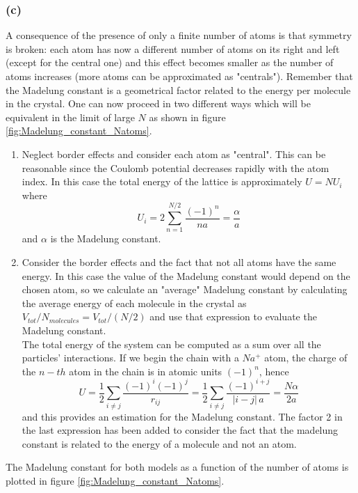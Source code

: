 \subsubsection*{(c)}
A consequence of the presence of only a finite number of atoms is that symmetry is broken: each atom has now a different number of atoms on its right and left (except for the central one) and this 
effect becomes smaller as the number of atoms increases (more atoms can be approximated as "centrals"). Remember that the Madelung constant is a geometrical factor related to the energy per molecule in the crystal. 
One can now proceed in two different ways which will be equivalent in the limit of large $N$ as shown in figure \ref{fig:Madelung_constant_Natoms}. \\
\begin{enumerate}
    \item Neglect border effects and consider each atom as "central". This can be reasonable since the Coulomb potential decreases rapidly with the atom index. In this case the total energy of the lattice is approximately
    $U = NU_i$ where
    $$ U_i = 2\sum_{n=1}^{N/2}\frac{(-1)^n}{n a} = \frac{\alpha}{a}$$
    and $\alpha$ is the Madelung constant.
    \item Consider the border effects and the fact that not all atoms have the same energy. In this case the value of the Madelung constant would depend on the chosen atom, so we calculate an "average" Madelung constant by calculating the average energy of each molecule in the crystal as $V_{tot}/N_{molecules} = V_{tot}/(N/2)$ and use that expression to evaluate the Madelung constant. \\
        The total energy of the system can be computed as a sum over all the particles' interactions. If we begin the chain with a $Na^+$ atom, the charge of the $n-th$ atom in the chain is in atomic units $(-1)^n$, hence
        $$U = \frac{1}{2} \sum_{i \neq j} \frac{(-1)^i(-1)^j}{r_{ij}} = \frac{1}{2} \sum_{i \neq j} \frac{(-1)^{i+j}}{|i-j| \, a} =
        \frac{N\alpha}{2a}$$
        and this provides an estimation for the Madelung constant. The factor 2 in the last expression has been added to consider the fact that the madelung constant is related to the energy of a molecule and not an atom.
\end{enumerate} 
The Madelung constant for both models as a function of the number of atoms is plotted in figure \ref{fig:Madelung_constant_Natoms}.
